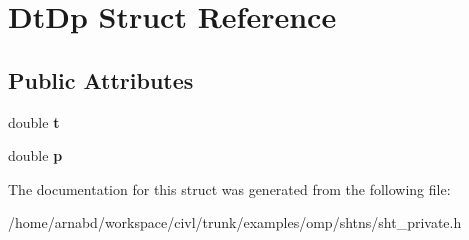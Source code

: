 \hypertarget{structDtDp}{}\section{Dt\+Dp Struct Reference}
\label{structDtDp}
\subsection*{Public Attributes}
\begin{DoxyCompactItemize}
\item 
\hypertarget{structDtDp_afa408a85eb13790e9013037412dc08e9}{}double {\bfseries t}\label{structDtDp_afa408a85eb13790e9013037412dc08e9}

\item 
\hypertarget{structDtDp_a9d3b6f1095a618fdd68ad71b67fe78cb}{}double {\bfseries p}\label{structDtDp_a9d3b6f1095a618fdd68ad71b67fe78cb}

\end{DoxyCompactItemize}


The documentation for this struct was generated from the following file\+:\begin{DoxyCompactItemize}
\item 
/home/arnabd/workspace/civl/trunk/examples/omp/shtns/sht\+\_\+private.\+h\end{DoxyCompactItemize}
